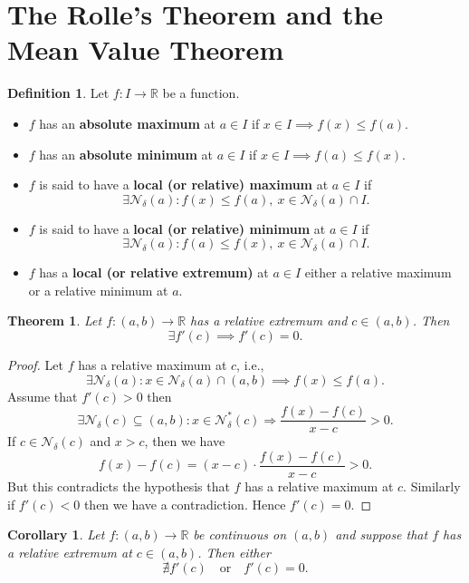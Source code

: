 \documentclass[12pt,openany]{book}
\newtheorem{theorem}{Theorem}[chapter]
\newtheorem{corollary}{Corollary}[theorem]
\theoremstyle{definition}
\newtheorem{definition}{Definition}[chapter]
\newcommand{\R}{\mathbb{R}}
\newcommand{\ie}{\textnormal{i.e.}}
\newcommand{\nbhd}{\mathcal{N}}
\begin{document}
	\newpage
	\section{The Rolle's Theorem and the Mean Value Theorem}
	\begin{tcolorbox}[colback=white,colframe=defcolor,arc=5pt,title={\color{white}\bf Absolute and Local Maxi/Mini-mum}]
		\begin{definition}
			Let $f:I\to\R$ be a function.
			\begin{itemize}
				\item $f$ has an \textbf{absolute maximum} at $a\in I$ if $x\in I\implies f(x)\leq f(a)$.
				\item $f$ has an \textbf{absolute minimum} at $a\in I$ if $x\in I\implies f(a)\leq f(x)$.
				\item $f$ is said to have a \textbf{local (or relative) maximum} at $a\in I$ if \[
				\exists\nbhd_\delta(a):f(x)\leq f(a),\ x\in\nbhd_\delta(a)\cap I.
				\]
				\item $f$ is said to have a \textbf{local (or relative) minimum} at $a\in I$ if \[
				\exists\nbhd_\delta(a):f(a)\leq f(x),\ x\in\nbhd_\delta(a)\cap I.
				\]
				\item $f$ has a \textbf{local (or relative extremum)} at $a\in I$ either a relative maximum or a relative minimum at $a$.
			\end{itemize}
		\end{definition}
	\end{tcolorbox}
	\vspace{8pt}
	\begin{tcolorbox}[colback=white,colframe=thmcolor,arc=5pt,title={\color{white}\bf Interior Extremum Theorem}]
		\begin{theorem}
		Let $f:(a,b)\to\R$ has a relative extremum and $c\in(a,b)$. Then \[
		\exists f'(c)\implies f'(c)=0.
		\]
		\end{theorem}
	\end{tcolorbox}
	\begin{proof}
		Let $f$ has a relative maximum at $c$, \ie, \[
		\exists\nbhd_\delta(a): x\in\nbhd_\delta(a)\cap (a,b)\implies f(x)\leq f(a).
		\] Assume that $f'(c)>0$ then \[
		\exists\nbhd_\delta(c)\subseteq(a,b):x\in\nbhd_\delta^*(c)\Rightarrow\frac{f(x)-f(c)}{x-c}>0.
		\] If $c\in\nbhd_\delta(c)$ and $x>c$, then we have \[
		f(x)-f(c)=(x-c)\cdot\frac{f(x)-f(c)}{x-c}>0.
		\] But this contradicts the hypothesis that $f$ has a relative maximum at $c$. Similarly if $f'(c)<0$ then we have a contradiction. Hence $f'(c)=0$.
	\end{proof}
	\vspace{4pt}
	\begin{tcolorbox}[colback=white,colframe=corcolor,arc=5pt,title={\color{white}\bf }]
		\begin{corollary}
			Let $f:(a,b)\to\R$ be continuous on $(a, b)$ and suppose that $f$ has a relative
			extremum at $c\in(a, b)$. Then either \[
			\nexists f'(c)\quad\text{or}\quad f'(c)=0.
			\]
		\end{corollary}
	\end{tcolorbox}
	\vspace{8pt}
	
\end{document}
